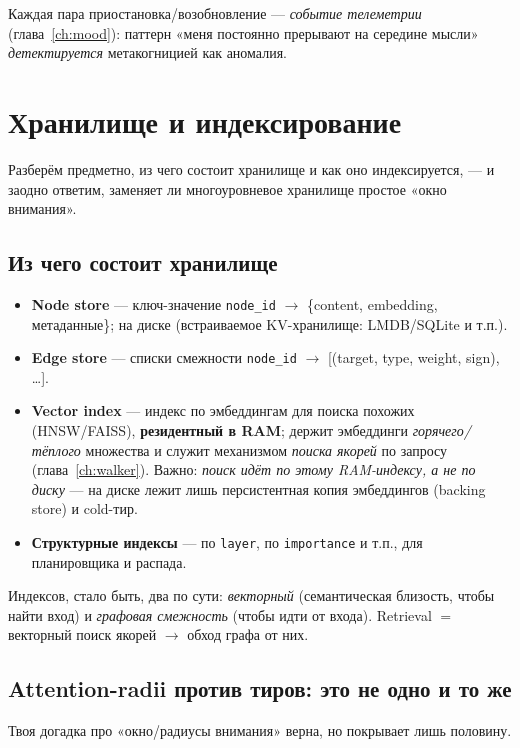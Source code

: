 Каждая пара приостановка/возобновление — \emph{событие телеметрии} (глава~\ref{ch:mood}):
паттерн «меня постоянно прерывают на середине мысли» \emph{детектируется} метакогницией
как аномалия.

\section{Хранилище и индексирование}
\label{sec:storage}

Разберём предметно, из чего состоит хранилище и как оно индексируется, — и заодно
ответим, заменяет ли многоуровневое хранилище простое «окно внимания».

\subsection{Из чего состоит хранилище}

\begin{itemize}\itemsep1pt
\item \textbf{Node store} — ключ-значение \texttt{node\_id} $\to$ \{content,
embedding, метаданные\}; на диске (встраиваемое KV-хранилище: LMDB/SQLite и т.п.).
\item \textbf{Edge store} — списки смежности \texttt{node\_id} $\to$
[(target, type, weight, sign), \dots].
\item \textbf{Vector index} — индекс по эмбеддингам для поиска похожих (HNSW/FAISS),
\textbf{резидентный в RAM}; держит эмбеддинги \emph{горячего/тёплого} множества и
служит механизмом \emph{поиска якорей} по запросу (глава~\ref{ch:walker}). Важно:
\emph{поиск идёт по этому RAM-индексу, а не по диску} — на диске лежит лишь
персистентная копия эмбеддингов (backing store) и cold-тир.
\item \textbf{Структурные индексы} — по \texttt{layer}, по \texttt{importance} и т.п.,
для планировщика и распада.
\end{itemize}
Индексов, стало быть, два по сути: \emph{векторный} (семантическая близость, чтобы
найти вход) и \emph{графовая смежность} (чтобы идти от входа). Retrieval $=$ векторный
поиск якорей $\to$ обход графа от них.

\subsection{Attention-radii против тиров: это не одно и то же}

Твоя догадка про «окно/радиусы внимания» верна, но покрывает лишь половину.

